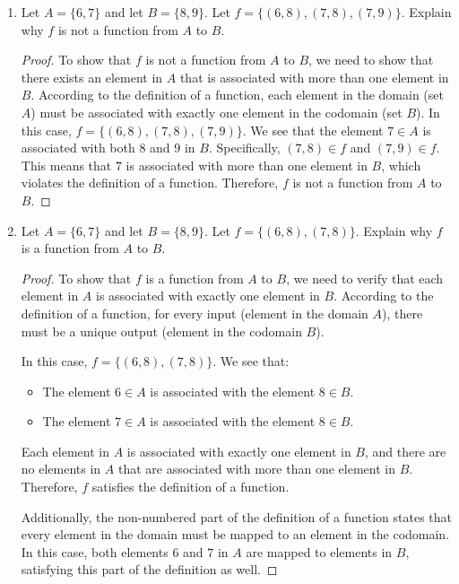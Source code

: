 \documentclass{article}
\begin{document}
\begin{enumerate}
          \newpage

    \item Let $A = \{6,7\}$ and let $B=\{8,9\}$. Let $f=\{(6,8),(7,8),(7,9)\}$. Explain
          why $f$ is not a function from $A$ to $B$.

          \begin{proof}
              To show that $f$ is not a function from $A$ to $B$, we need to show that there exists an element in $A$ that is associated with more than one element in $B$. According to the definition of a function, each element in the domain (set $A$) must be associated with exactly one element in the codomain (set $B$).
              In this case, $f = \{(6,8),(7,8),(7,9)\}$. We see that the element $7 \in A$ is associated with both $8$ and $9$ in $B$. Specifically, $(7,8) \in f$ and $(7,9) \in f$. This means that $7$ is associated with more than one element in $B$, which violates the definition of a function.
              Therefore, $f$ is not a function from $A$ to $B$.
          \end{proof}

          \newpage

    \item Let $A = \{6,7\}$ and let $B=\{8,9\}$. Let $f=\{(6,8),(7,8)\}$. Explain why $f$
          is a function from $A$ to $B$.

          \begin{proof}
              To show that $f$ is a function from $A$ to $B$, we need to verify that each element in $A$ is associated with exactly one element in $B$. According to the definition of a function, for every input (element in the domain $A$), there must be a unique output (element in the codomain $B$).

              In this case, $f = \{(6,8),(7,8)\}$. We see that:
              \begin{itemize}
                  \item The element $6 \in A$ is associated with the element $8 \in B$.
                  \item The element $7 \in A$ is associated with the element $8 \in B$.
              \end{itemize}
              Each element in $A$ is associated with exactly one element in $B$, and there are no elements in $A$ that are associated with more than one element in $B$. Therefore, $f$ satisfies the definition of a function.

              Additionally, the non-numbered part of the definition of a function states that
              every element in the domain must be mapped to an element in the codomain. In
              this case, both elements $6$ and $7$ in $A$ are mapped to elements in $B$,
              satisfying this part of the definition as well.


\end{proof}
\end{enumerate}
\end{document}
